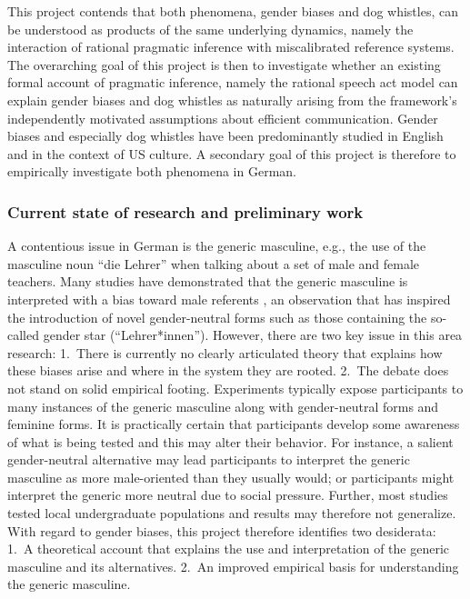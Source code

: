 \documentclass[11pt]{article}
\begin{document}
This project contends that both phenomena, gender biases and dog whistles, can be understood as products of the same underlying dynamics, namely the interaction of rational pragmatic inference with miscalibrated reference systems.  The overarching goal of this project is then to investigate whether an existing formal account of pragmatic inference, namely the rational speech act model \parencite[RSA, ][]{FrankGoodman2012} can explain gender biases and dog whistles as naturally arising from the framework’s independently motivated assumptions about efficient communication.  Gender biases and especially dog whistles have been predominantly studied in English and in the context of US culture.  A secondary goal of this project is therefore to empirically investigate both phenomena in German.

\subsubsection{Current state of research and preliminary work}



A contentious issue in German is the generic masculine, e.g., the use of the masculine noun “die Lehrer” when talking about a set of male and female teachers.  Many studies have demonstrated that the generic masculine is interpreted with a bias toward male referents \parencite[e.g.,][]{GygaxEtAl2008, Kusterle2011}, an observation that has inspired the introduction of novel gender-neutral forms such as those containing the so-called gender star (“Lehrer*innen”).  However, there are two key issue in this area research: 1.\ There is currently no clearly articulated theory that explains how these biases arise and where in the system they are rooted.  2.\ The debate does not stand on solid empirical footing.  Experiments typically expose participants to many instances of the generic masculine along with gender-neutral forms and feminine forms.  It is practically certain that participants develop some awareness of what is being tested and this may alter their behavior.  For instance, a salient gender-neutral alternative may lead participants to interpret the generic masculine as more male-oriented than they usually would; or participants might interpret the generic more neutral due to social pressure.  Further, most studies tested local undergraduate populations and results may therefore not generalize.  With regard to gender biases, this project therefore identifies two desiderata: 1.\ A theoretical account that explains the use and interpretation of the generic masculine and its alternatives.  2.\ An improved empirical basis for understanding the generic masculine.
\end{document}
